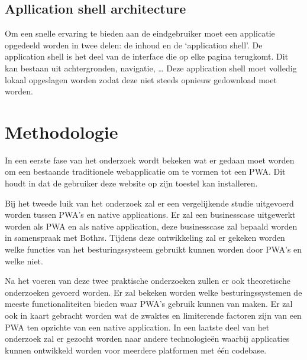 \subsection{Apllication shell architecture}
Om een snelle ervaring te bieden aan de eindgebruiker moet een applicatie opgedeeld worden in twee delen: de inhoud en de ‘application shell’.
De application shell is het deel van de interface die op elke pagina terugkomt. Dit kan bestaan uit achtergronden, navigatie, …
Deze application shell moet volledig lokaal opgeslagen worden zodat deze niet steeds opnieuw gedownload moet worden.
\autocite{Hiltunen2018}




\section{Methodologie}
\label{sec:methodologie}

In een eerste fase van het onderzoek wordt bekeken wat er gedaan moet worden om een bestaande traditionele webapplicatie om te vormen tot een PWA. Dit houdt in dat de gebruiker deze website op zijn toestel kan installeren. 

Bij het tweede luik van het onderzoek zal er een vergelijkende studie uitgevoerd worden tussen PWA's en native applications. Er zal een businesscase uitgewerkt worden als PWA en als native application, deze businesscase zal bepaald worden in samenspraak met Bothrs. 
Tijdens deze ontwikkeling zal er gekeken worden welke functies van het besturingssysteem gebruikt kunnen worden door PWA's en welke niet.

Na het voeren van deze twee praktische onderzoeken zullen er ook theoretische onderzoeken gevoerd worden. 
Er zal bekeken worden welke besturingssystemen de meeste functionaliteiten bieden waar PWA's gebruik kunnen van maken. 
Er zal ook in kaart gebracht worden wat de zwaktes en limiterende factoren zijn van een PWA ten opzichte van een native application.
In een laatste deel van het onderzoek zal er gezocht worden naar andere technologieën waarbij applicaties kunnen ontwikkeld worden voor meerdere platformen met één codebase.


